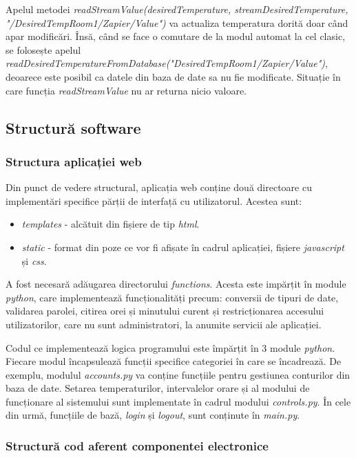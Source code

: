 	Apelul metodei \textit{readStreamValue(desiredTemperature, streamDesiredTemperature, "/DesiredTempRoom1/Zapier/Value")} va actualiza temperatura dorită doar când apar modificări. Însă, când se face o comutare de la modul automat la cel clasic, se folosește apelul \textit{readDesiredTemperatureFromDatabase("DesiredTempRoom1/Zapier/Value")}, deoarece este posibil ca datele din baza de date sa nu fie modificate. Situație în care funcția \textit{readStreamValue} nu ar returna nicio valoare.

\subsection{Structură software}

\subsubsection{Structura aplicației web}

	Din punct de vedere structural, aplicația web conține două directoare cu implementări specifice părții de interfață cu utilizatorul. Acestea sunt:
	\begin{itemize}
		\setlength{\itemindent}{2em}
			\itemsep0em
			\item \textit{templates} - alcătuit din fișiere de tip \textit{html}.
			\item \textit{static} - format din poze ce vor fi afișate în cadrul aplicației, fișiere \textit{javascript} și \textit{css}.
	\end{itemize}

	A fost necesară adăugarea directorului \textit{functions}. Acesta este impărțit în module \textit{python}, care implementează funcționalități precum: conversii de tipuri de date, validarea parolei, citirea orei și minutului curent și restricționarea accesului utilizatorilor, care nu sunt administratori, la anumite servicii ale aplicației.

	Codul ce implementează logica programului este împărțit în 3 module \textit{python}. Fiecare modul încapsulează funcții specifice categoriei în care se încadrează. De exemplu, modulul \textit{accounts.py} va conține funcțiile pentru gestiunea conturilor din baza de date. Setarea temperaturilor, intervalelor orare și al modului de funcționare al sistemului sunt implementate în cadrul modului \textit{controls.py}. În cele din urmă, funcțiile de bază, \textit{login} și \textit{logout}, sunt conținute în \textit{main.py}.     
	 
\subsubsection{Structură cod aferent componentei electronice}
	

